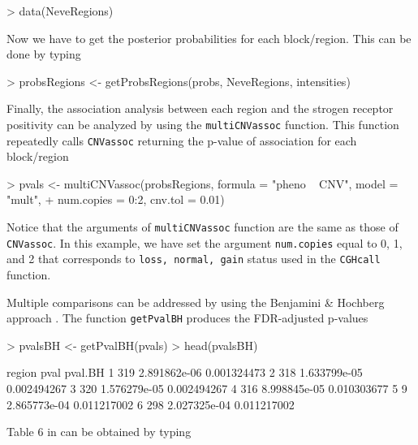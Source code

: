 \documentclass[11pt]{article}
\begin{document}
\begin{Schunk}
\begin{Sinput}
> data(NeveRegions)
\end{Sinput}
\end{Schunk}

%
Now we have to get the posterior probabilities for each block/region. This can be done by typing
%

\begin{Schunk}
\begin{Sinput}
> probsRegions <- getProbsRegions(probs, NeveRegions, intensities)
\end{Sinput}
\end{Schunk}

%
Finally, the association analysis between each region and the strogen receptor positivity can be analyzed by using the {\tt multiCNVassoc} 
function. This function repeatedly calls {\tt CNVassoc} returning the p-value of association for each block/region
%

\begin{Schunk}
\begin{Sinput}
> pvals <- multiCNVassoc(probsRegions, formula = "pheno ~ CNV", model = "mult", 
+ num.copies = 0:2, cnv.tol = 0.01)
\end{Sinput}
\end{Schunk}

%
Notice that the arguments of {\tt multiCNVassoc} function are the same as those of {\tt CNVassoc}. In this example, we have set the 
argument {\tt num.copies} equal to 0, 1, and 2 that corresponds to {\tt loss, normal, gain} status used in the {\tt CGHcall} function.

Multiple comparisons can be addressed by using the Benjamini \& Hochberg approach \cite{BenHoc95}. The function {\tt getPvalBH} produces the FDR-adjusted p-values
%

\begin{Schunk}
\begin{Sinput}
> pvalsBH <- getPvalBH(pvals)
> head(pvalsBH)
\end{Sinput}
\begin{Soutput}
  region         pval     pval.BH
1    319 2.891862e-06 0.001324473
2    318 1.633799e-05 0.002494267
3    320 1.576279e-05 0.002494267
4    316 8.998845e-05 0.010303677
5      9 2.865773e-04 0.011217002
6    298 2.027325e-04 0.011217002
\end{Soutput}
\end{Schunk}

%
Table 6 in \cite{GonSubEsc09} can be obtained by typing
%
\end{document}
